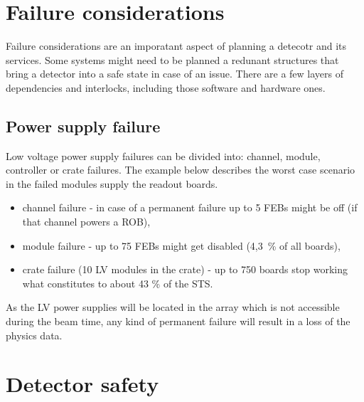 \section{Failure considerations}

Failure considerations are an imporatant aspect of planning a detecotr and its services. Some systems might need to be planned a redunant structures that bring a detector into a safe state in case of an issue. There are a few layers of dependencies and interlocks, including those software and hardware ones.

\subsection{Power supply failure}
Low voltage power supply failures can be divided into: channel, module, controller or crate failures. The example below describes the worst case scenario in the failed modules supply the readout boards.

\begin{itemize}
    \item channel failure - in case of a permanent failure up to 5 \gls{FEB}s might be off (if that channel powers a \gls{ROB}),
    \item module failure - up to 75 \gls{FEB}s might get disabled (4,3~\% of all boards), 
    \item crate failure (10 LV modules in the crate) - up to 750 boards stop working what constitutes to about 43 \% of the STS.
\end{itemize}

As the LV power supplies will be located in the array which is not accessible during the beam time, any kind of permanent failure will result in a loss of the physics data. 

\section{Detector safety}
